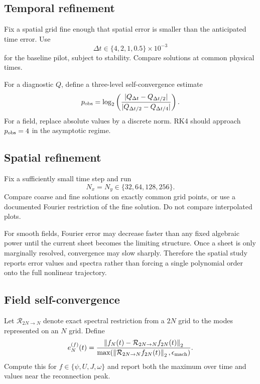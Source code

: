 \documentclass[11pt]{article}
\newcommand{\norm}[1]{\left\lVert #1\right\rVert}
\begin{document}
\subsection{Temporal refinement}

Fix a spatial grid fine enough that spatial error is smaller than the anticipated time error. Use
\begin{equation}
\Delta t\in
\{4,2,1,0.5\}\times10^{-3}
\end{equation}
for the baseline pilot, subject to stability. Compare solutions at common physical times.

For a diagnostic $Q$, define a three-level self-convergence estimate
\begin{equation}
p_{\rm obs}
=\log_2
\left(
\frac{|Q_{\Delta t}-Q_{\Delta t/2}|}
{|Q_{\Delta t/2}-Q_{\Delta t/4}|}
\right).
\label{eq:pobs}
\end{equation}
For a field, replace absolute values by a discrete norm. RK4 should approach $p_{\rm obs}=4$ in the asymptotic regime.

\subsection{Spatial refinement}

Fix a sufficiently small time step and run
\begin{equation}
N_x=N_y\in\{32,64,128,256\}.
\end{equation}
Compare coarse and fine solutions on exactly common grid points, or use a documented Fourier restriction of the fine solution. Do not compare interpolated plots.

For smooth fields, Fourier error may decrease faster than any fixed algebraic power until the current sheet becomes the limiting structure. Once a sheet is only marginally resolved, convergence may slow sharply. Therefore the spatial study reports error values and spectra rather than forcing a single polynomial order onto the full nonlinear trajectory.

\subsection{Field self-convergence}

Let $\mathcal R_{2N\to N}$ denote exact spectral restriction from a $2N$ grid to the modes represented on an $N$ grid. Define
\begin{equation}
e_N^{(f)}(t)
=\frac{
\norm{f_N(t)-\mathcal R_{2N\to N}f_{2N}(t)}_2}
{\max(\norm{\mathcal R_{2N\to N}f_{2N}(t)}_2,\epsilon_{\rm mach})}.
\end{equation}
Compute this for $f\in\{\psi,U,J,\omega\}$ and report both the maximum over time and values near the reconnection peak.
\end{document}
